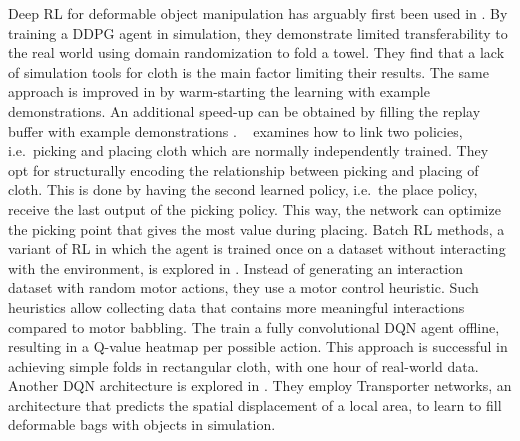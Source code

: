 \documentclass[\home/main.tex]{subfiles}
\begin{document}
Deep RL for deformable object manipulation has arguably first been used in \autocite{Matas2018}. By training a DDPG agent in simulation, they demonstrate limited transferability to the real world using domain randomization to fold a towel. They find that a lack of simulation tools for cloth is the main factor limiting their results. The same approach is improved in \autocite{Jangir2020} by warm-starting the learning with example demonstrations. An additional speed-up can be obtained by filling the replay buffer with example demonstrations \autocite{Tsurumine2019}. ~\textcite{Wu2020} examines how to link two policies, i.e.\ picking and placing cloth which are normally independently trained. They opt for structurally encoding the relationship between picking and placing of cloth. This is done by having the second learned policy, i.e.\ the place policy, receive the last output of the picking policy. This way, the network can optimize the picking point that gives the most value during placing. Batch RL methods, a variant of RL in which the agent is trained once on a dataset without interacting with the environment, is explored in \autocite{lee2020learning}. Instead of generating an interaction dataset with random motor actions, they use a motor control heuristic. Such heuristics allow collecting data that contains more meaningful interactions compared to motor babbling. The train a fully convolutional DQN agent offline, resulting in a Q-value heatmap per possible action. This approach is successful in achieving simple folds in rectangular cloth, with one hour of real-world data. Another DQN architecture is explored in \autocite{seita2021learning}. They employ Transporter networks, an architecture that predicts the spatial displacement of a local area, to learn to fill deformable bags with objects in simulation.
\end{document}
